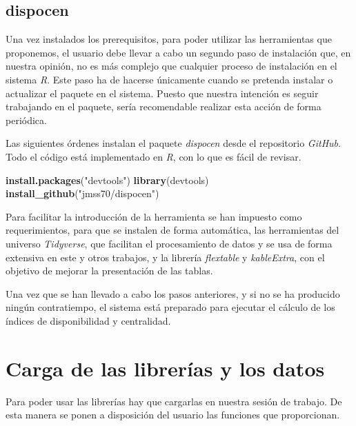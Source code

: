 \documentclass[
]{article}
\newenvironment{Shaded}{\begin{snugshade}}{\end{snugshade}}
\newcommand{\KeywordTok}[1]{\textcolor[rgb]{0.13,0.29,0.53}{\textbf{#1}}}
\newcommand{\NormalTok}[1]{#1}
\newcommand{\StringTok}[1]{\textcolor[rgb]{0.31,0.60,0.02}{#1}}
\begin{document}
\hypertarget{dispocen}{%
\subsection{dispocen}\label{dispocen}}

Una vez instalados los prerequisitos, para poder utilizar las
herramientas que proponemos, el usuario debe llevar a cabo un segundo
paso de instalación que, en nuestra opinión, no es más complejo que
cualquier proceso de instalación en el sistema \emph{R}. Este paso ha de
hacerse únicamente cuando se pretenda instalar o actualizar el paquete
en el sistema. Puesto que nuestra intención es seguir trabajando en el
paquete, sería recomendable realizar esta acción de forma periódica.

Las siguientes órdenes instalan el paquete \emph{dispocen} desde el
repositorio \emph{GitHub}. Todo el código está implementado en \emph{R},
con lo que es fácil de revisar.

\begin{Shaded}
\begin{Highlighting}[]
\KeywordTok{install.packages}\NormalTok{(}\StringTok{"devtools"}\NormalTok{)}
\KeywordTok{library}\NormalTok{(devtools)}
\KeywordTok{install_github}\NormalTok{(}\StringTok{"jmss70/dispocen"}\NormalTok{)}
\end{Highlighting}
\end{Shaded}

Para facilitar la introducción de la herramienta se han impuesto como
requerimientos, para que se instalen de forma automática, las
herramientas del universo \emph{Tidyverse}, que facilitan el
procesamiento de datos y se usa de forma extensiva en este y otros
trabajos, y la librería \emph{flextable} y \emph{kableExtra}, con el
objetivo de mejorar la presentación de las tablas.

Una vez que se han llevado a cabo los pasos anteriores, y si no se ha
producido ningún contratiempo, el sistema está preparado para ejecutar
el cálculo de los índices de disponibilidad y centralidad.

\hypertarget{carga-de-las-libreruxedas-y-los-datos}{%
\section{Carga de las librerías y los
datos}\label{carga-de-las-libreruxedas-y-los-datos}}

Para poder usar las librerías hay que cargarlas en nuestra sesión de
trabajo. De esta manera se ponen a disposición del usuario las funciones
que proporcionan.
\end{document}
